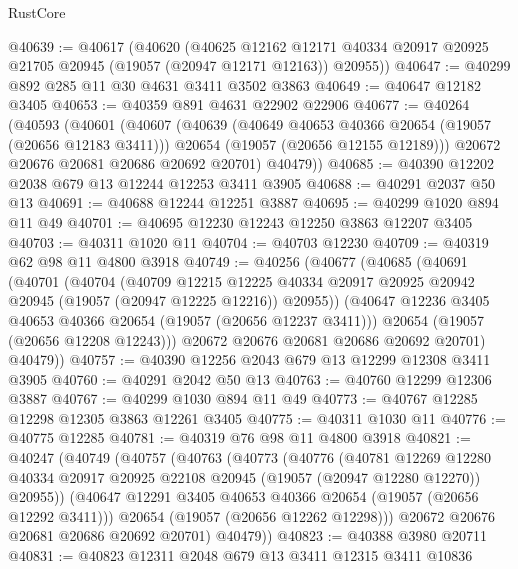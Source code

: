 \begin{lexlean}{RustCore}
\begin{coremodule}
@40639 := @40617
    (@40620
      (@40625
        @12162
        @12171
        @40334
        @20917
        @20925
        @21705
        @20945
        (@19057 (@20947 @12171 @12163))
        @20955))
@40647 := @40299 @892 @285 @11 @30 @4631 @3411 @3502 @3863
@40649 := @40647 @12182 @3405
@40653 := @40359 @891 @4631 @22902 @22906
@40677 := @40264
    (@40593
      (@40601
        (@40607
          (@40639
            (@40649 @40653 @40366 @20654 (@19057 (@20656 @12183 @3411)))
            @20654
            (@19057 (@20656 @12155 @12189)))
          @20672
          @20676
          @20681
          @20686
          @20692
          @20701)
        @40479))
@40685 := @40390 @12202 @2038 @679 @13 @12244 @12253 @3411 @3905
@40688 := @40291 @2037 @50 @13
@40691 := @40688 @12244 @12251 @3887
@40695 := @40299 @1020 @894 @11 @49
@40701 := @40695 @12230 @12243 @12250 @3863 @12207 @3405
@40703 := @40311 @1020 @11
@40704 := @40703 @12230
@40709 := @40319 @62 @98 @11 @4800 @3918
@40749 := @40256
    (@40677
      (@40685
        (@40691
          (@40701
            (@40704
              (@40709
                @12215
                @12225
                @40334
                @20917
                @20925
                @20942
                @20945
                (@19057 (@20947 @12225 @12216))
                @20955))
            (@40647 @12236 @3405 @40653 @40366 @20654 (@19057 (@20656 @12237 @3411)))
            @20654
            (@19057 (@20656 @12208 @12243)))
          @20672
          @20676
          @20681
          @20686
          @20692
          @20701)
        @40479))
@40757 := @40390 @12256 @2043 @679 @13 @12299 @12308 @3411 @3905
@40760 := @40291 @2042 @50 @13
@40763 := @40760 @12299 @12306 @3887
@40767 := @40299 @1030 @894 @11 @49
@40773 := @40767 @12285 @12298 @12305 @3863 @12261 @3405
@40775 := @40311 @1030 @11
@40776 := @40775 @12285
@40781 := @40319 @76 @98 @11 @4800 @3918
@40821 := @40247
    (@40749
      (@40757
        (@40763
          (@40773
            (@40776
              (@40781
                @12269
                @12280
                @40334
                @20917
                @20925
                @22108
                @20945
                (@19057 (@20947 @12280 @12270))
                @20955))
            (@40647 @12291 @3405 @40653 @40366 @20654 (@19057 (@20656 @12292 @3411)))
            @20654
            (@19057 (@20656 @12262 @12298)))
          @20672
          @20676
          @20681
          @20686
          @20692
          @20701)
        @40479))
@40823 := @40388 @3980 @20711
@40831 := @40823 @12311 @2048 @679 @13 @3411 @12315 @3411 @10836

\end{coremodule}
\end{lexlean}
